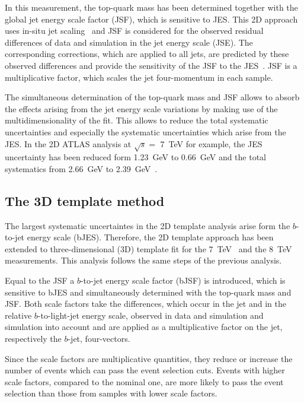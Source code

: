 In this measurement,  the top-quark mass has been determined together with the global jet energy scale factor (JSF), which is sensitive to JES.  This 2D approach uses in-situ jet scaling~\cite{ATLAS:2012aj} and JSF is considered for the observed residual differences of data and simulation in the jet energy scale (JSE). The corresponding corrections, which are applied to all jets, are predicted by these observed differences and provide the sensitivity of the JSF to the JES~\cite{ATLAS:2012aj}. JSF is a multiplicative factor, which scales the jet four-momentum in each sample.  

The simultaneous determination of the top-quark mass and JSF allows to absorb the effects arising from the jet energy scale variations by making use of the multidimensionality of the fit.
This allows to reduce the total systematic uncertainties and especially the systematic uncertainties which arise from the JES. In the 2D ATLAS analysis at $\sqrt{s} =$ 7~TeV  for example, the JES uncertainty has been reduced form 1.23~GeV to 0.66~GeV and the total systematics from 2.66~GeV to 2.39~GeV~\cite{ATLAS:2012aj}.  


\subsection{ The 3D template method}
The largest systematic uncertaintes in the 2D template analysis arise form the $b$-to-jet energy scale (bJES). Therefore, the 2D template approach has been extended to three-dimensional (3D) template fit for the 7~TeV~\cite{Aad:2015nba} and the 8~TeV~\cite{ATLAS-CONF-2017-071} measurements. This analysis follows  the same steps of the previous analysis. 

 Equal to the JSF a $b$-to-jet energy scale factor (bJSF) is introduced, which is sensitive to bJES  and simultaneously determined with the top-quark mass and JSF.  Both scale factors take the differences, which occur in the jet and in the relative
  $b$-to-light-jet energy scale, observed in data and simulation and simulation into account and are applied as a multiplicative factor on the jet, respectively the $b$-jet, four-vectors. 
  
  Since the scale factors are  multiplicative quantities, they reduce or increase the number of events which can pass the event selection cuts. Events with higher scale factors, compared to the nominal one, are more likely to pass the event selection than those from samples with lower scale factors. 
 
